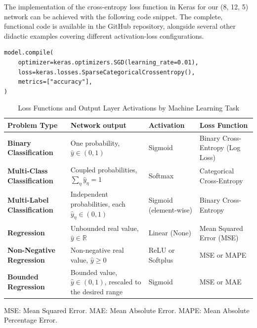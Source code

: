 \documentclass[11pt,a4paper,oneside]{book}
\theoremstyle{definition}
\theoremstyle{plain}
\theoremstyle{remark}
\begin{document}
The implementation of the cross-entropy loss function in Keras for our (8, 12, 5) network can be achieved with the following code snippet. The complete, functional code is available in the GitHub repository, alongside several other didactic examples covering different activation-loss configurations.

\vspace{10pt}
\begin{lstlisting}
model.compile(
    optimizer=keras.optimizers.SGD(learning_rate=0.01),
    loss=keras.losses.SparseCategoricalCrossentropy(),
    metrics=["accuracy"],
)
\end{lstlisting}
\vspace{10pt}

\newpage

\begin{table}[htbp]
  \centering
  \caption{Loss Functions and Output Layer Activations by Machine Learning Task}
  \label{tab:loss_activations}
  \vspace{0.5em}
  \small
  \begin{tabularx}{\textwidth}{>{\raggedright\arraybackslash}p{2.6cm} >{\raggedright\arraybackslash}X >{\raggedright\arraybackslash}p{2.2cm} >{\raggedright\arraybackslash}p{3.4cm}}
    \toprule
    \textbf{Problem Type} & \textbf{Network output} & \textbf{Activation} & \textbf{Loss Function}\\
    \midrule
    \textbf{Binary Classification} & One probability, $\hat y\in(0,1)$ & Sigmoid & Binary Cross-Entropy (Log Loss)\\
    \addlinespace
    \textbf{Multi-Class Classification} & Coupled probabilities, $\sum_\eta\hat y_\eta=1$ & Softmax & Categorical Cross-Entropy\\
    \addlinespace
    \textbf{Multi-Label Classification} & Independent probabilities, each $\hat y_\eta\in(0,1)$ & Sigmoid (element-wise) & Binary Cross-Entropy\\
    \addlinespace
    \textbf{Regression} & Unbounded real value, $\hat y\in\mathbb{R}$ & Linear (None) & Mean Squared Error (MSE)\\
    \addlinespace
    \textbf{Non-Negative Regression} & Non-negative real value, $\hat y\ge0$ & ReLU or Softplus & MSE or MAPE\\
    \addlinespace
    \textbf{Bounded Regression} & Bounded value, $\hat y\in(0,1)$, rescaled to the desired range & Sigmoid & MSE or MAE\\
    \bottomrule
  \end{tabularx}
  \begin{flushleft}
  \small
  MSE: Mean Squared Error. MAE: Mean Absolute Error. MAPE: Mean Absolute Percentage Error.


\end{flushleft}
\end{table}
\end{document}
